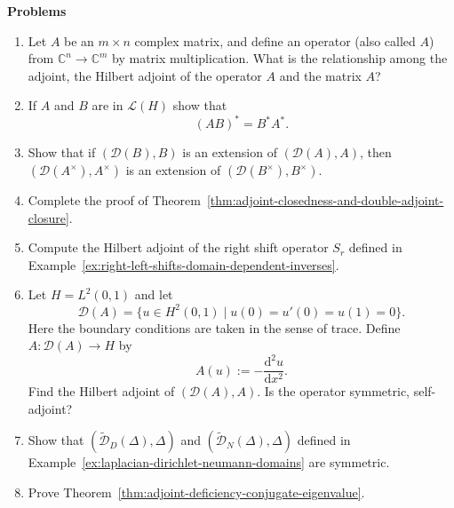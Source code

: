 \textbf{Problems}

\begin{enumerate}[label=\thesection.\arabic*.,ref=\thesection.\arabic*,start=24,series=book-problems]

\item\label{ex:complex-matrix-banach-hilbert-adjoints} Let $A$ be an $m\times n$ complex matrix, and define an operator (also called $A$) from $\mathbb{C}^n\to\mathbb{C}^m$ by matrix multiplication. What is the relationship among the adjoint, the Hilbert adjoint of the operator $A$ and the matrix $A$?

\item\label{ex:hilbert-adjoint-product-reversal} If $A$ and $B$ are in $\mathcal{L}(H)$ show that\[(AB)^*=B^*A^*.\]

\item\label{ex:operator-extension-adjoint-reverse-extension} Show that if $(\mathcal{D}(B),B)$ is an extension of $(\mathcal{D}(A),A)$, then $(\mathcal{D}(A^\times),A^\times)$ is an extension of $(\mathcal{D}(B^\times),B^\times)$.

\item\label{ex:adjoint-closure-theorem-proof-completion} Complete the proof of Theorem~\ref{thm:adjoint-closedness-and-double-adjoint-closure}.

\item\label{ex:right-shift-hilbert-adjoint} Compute the Hilbert adjoint of the right shift operator $S_r$ defined in Example~\ref{ex:right-left-shifts-domain-dependent-inverses}.

\item\label{ex:second-derivative-symmetric-not-self-adjoint} Let $H=L^2(0,1)$ and let\[\mathcal{D}(A)=\{u\in H^2(0,1)\mid u(0)=u'(0)=u(1)=0\}.\]Here the boundary conditions are taken in the sense of trace. Define $A:\mathcal{D}(A)\to H$ by\[A(u):=-\dfrac{\mathrm{d}^2u}{\mathrm{d}x^2}.\]Find the Hilbert adjoint of $(\mathcal{D}(A),A)$. Is the operator symmetric, self-adjoint?

\item\label{ex:classical-laplacian-boundary-domains-symmetric} Show that $(\widetilde{\mathcal{D}}_D(\Delta),\Delta)$ and $(\widetilde{\mathcal{D}}_N(\Delta),\Delta)$ defined in Example~\ref{ex:laplacian-dirichlet-neumann-domains} are symmetric.

\item\label{ex:adjoint-deficiency-eigenvalue-proof} Prove Theorem~\ref{thm:adjoint-deficiency-conjugate-eigenvalue}.


\end{enumerate}
